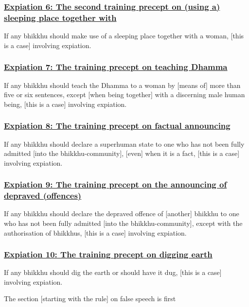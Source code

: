 \subsubsection*{\hyperref[pac6]{Expiation 6: The second training precept on (using a) sleeping place together with}}
\label{exp6}
If any bhikkhu should make use of a sleeping place together with a woman, [this is a case] involving expiation.

\subsubsection*{\hyperref[pac7]{Expiation 7: The training precept on teaching Dhamma}}
\label{exp7}
If any bhikkhu should teach the Dhamma to a woman by [means of] more than five or six sentences, except [when being together] with a discerning male human being, [this is a case] involving expiation.

\subsubsection*{\hyperref[pac8]{Expiation 8: The training precept on factual announcing}}
\label{exp8}
If any bhikkhu should declare a superhuman state to one who has not been fully admitted [into the bhikkhu-community], [even] when it is a fact, [this is a case] involving expiation.

\subsubsection*{\hyperref[pac9]{Expiation 9: The training precept on the announcing of depraved (offences)}}
\label{exp9}
If any bhikkhu should declare the depraved offence of [another] bhikkhu to one who has not been fully admitted [into the bhikkhu-community], except with the authorisation of bhikkhus, [this is a case] involving expiation.

\subsubsection*{\hyperref[pac10]{Expiation 10: The training precept on digging earth}}
\label{exp10}
If any bhikkhu should dig the earth or should have it dug, [this is a case] involving expiation.

\begin{center}
  The section [starting with the rule] on false speech is first
\end{center}

